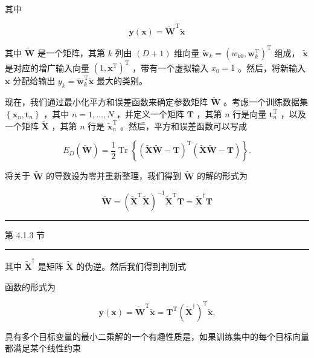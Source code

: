 \documentclass[10pt]{article}
\newcommand{\HRule}{\begin{center}\rule{0.9\linewidth}{0.2mm}\end{center}}
\begin{document}
其中

\[
\mathbf{y}\left( \mathbf{x}\right)  = {\widetilde{\mathbf{W}}}^{\mathrm{T}}\widetilde{\mathbf{x}} \tag{5.13}
\]

其中 \(\widetilde{\mathbf{W}}\) 是一个矩阵，其第 \(k\) 列由 \(\left( {D + 1}\right)\) 维向量 \({\widetilde{\mathbf{w}}}_{k} = {\left( {w}_{k0},{\mathbf{w}}_{k}^{\mathrm{T}}\right) }^{\mathrm{T}}\) 组成， \(\widetilde{\mathbf{x}}\) 是对应的增广输入向量 \({\left( 1,{\mathbf{x}}^{\mathrm{T}}\right) }^{\mathrm{T}}\) ，带有一个虚拟输入 \({x}_{0} = 1\) 。然后，将新输入 \(\mathbf{x}\) 分配给输出 \({y}_{k} = {\widetilde{\mathbf{w}}}_{k}^{\mathrm{T}}\widetilde{\mathbf{x}}\) 最大的类别。

现在，我们通过最小化平方和误差函数来确定参数矩阵 \(\widetilde{\mathbf{W}}\) 。考虑一个训练数据集 \(\left\{  {{\mathbf{x}}_{n},{\mathbf{t}}_{n}}\right\}\) ，其中 \(n = 1,\ldots ,N\) ，并定义一个矩阵 \(\mathbf{T}\) ，其第 \(n\) 行是向量 \({\mathbf{t}}_{n}^{\mathrm{T}}\) ，以及一个矩阵 \(\widetilde{\mathbf{X}}\) ，其第 \(n\) 行是 \({\widetilde{\mathbf{x}}}_{n}^{\mathrm{T}}\) 。然后，平方和误差函数可以写成

\[
{E}_{D}\left( \widetilde{\mathbf{W}}\right)  = \frac{1}{2}\operatorname{Tr}\left\{  {{\left( \widetilde{\mathbf{X}}\widetilde{\mathbf{W}} - \mathbf{T}\right) }^{\mathrm{T}}\left( {\widetilde{\mathbf{X}}\widetilde{\mathbf{W}} - \mathbf{T}}\right) }\right\}  . \tag{5.14}
\]

将关于 \(\widetilde{\mathbf{W}}\) 的导数设为零并重新整理，我们得到 \(\widetilde{\mathbf{W}}\) 的解的形式为

\[
\widetilde{\mathbf{W}} = {\left( {\widetilde{\mathbf{X}}}^{\mathrm{T}}\widetilde{\mathbf{X}}\right) }^{-1}{\widetilde{\mathbf{X}}}^{\mathrm{T}}\mathbf{T} = {\widetilde{\mathbf{X}}}^{ \dagger  }\mathbf{T} \tag{5.15}
\]

\HRule

第 4.1.3 节

\HRule

其中 \({\widetilde{\mathbf{X}}}^{ \dagger  }\) 是矩阵 \(\widetilde{\mathbf{X}}\) 的伪逆。然后我们得到判别式

函数的形式为

\[
\mathbf{y}\left( \mathbf{x}\right)  = {\widetilde{\mathbf{W}}}^{\mathrm{T}}\widetilde{\mathbf{x}} = {\mathbf{T}}^{\mathrm{T}}{\left( {\widetilde{\mathbf{X}}}^{ \dagger  }\right) }^{\mathrm{T}}\widetilde{\mathbf{x}}. \tag{5.16}
\]

具有多个目标变量的最小二乘解的一个有趣性质是，如果训练集中的每个目标向量都满足某个线性约束
\end{document}
